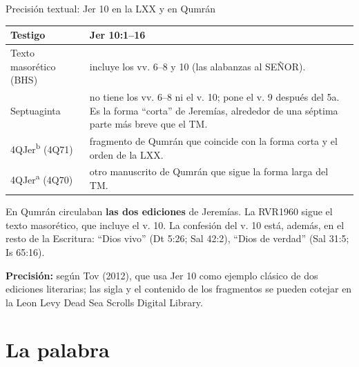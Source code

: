 \documentclass[hyperref={bookmarks=false},aspectratio=169]{beamer}
\newcommand{\SENOR}{S{\fontsize{0.78em}{1em}\selectfont EÑOR}}
\newcommand{\destacar}[1]{\textbf{\textcolor{azul}{#1}}}
\newcommand{\precision}[1]{{\footnotesize\color{gris}\textbf{Precisión:} #1}}
\begin{document}
\begin{frame}{Precisión textual: Jer 10 en la LXX y en Qumrán}
\scriptsize\renewcommand{\arraystretch}{1.2}
\begin{tabular}{@{}>{\RaggedRight\arraybackslash}p{3.1cm}>{\RaggedRight\arraybackslash}p{8.7cm}@{}}
\toprule
\textbf{Testigo} & \textbf{Jer 10:1--16} \\ \midrule
Texto masorético (BHS) & incluye los vv. 6--8 y 10 (las alabanzas al \SENOR). \\
Septuaginta & no tiene los vv. 6--8 ni el v. 10; pone el v. 9 después del 5a. Es la forma ``corta'' de Jeremías, alrededor de una séptima parte más breve que el TM. \\
4QJer\textsuperscript{b} (4Q71) & fragmento de Qumrán que coincide con la forma corta y el orden de la LXX. \\
4QJer\textsuperscript{a} (4Q70) & otro manuscrito de Qumrán que sigue la forma larga del TM. \\
\bottomrule
\end{tabular}\par\medskip
\small En Qumrán circulaban \destacar{las dos ediciones} de Jeremías. La RVR1960 sigue el texto masorético, que incluye el v. 10. La confesión del v. 10 está, además, en el resto de la Escritura: ``Dios vivo'' (Dt 5:26; Sal 42:2), ``Dios de verdad'' (Sal 31:5; Is 65:16).\par\smallskip
\precision{según Tov (2012), que usa Jer 10 como ejemplo clásico de dos ediciones literarias; las sigla y el contenido de los fragmentos se pueden cotejar en la Leon Levy Dead Sea Scrolls Digital Library.}
\end{frame}

\section{La palabra}
\end{document}
